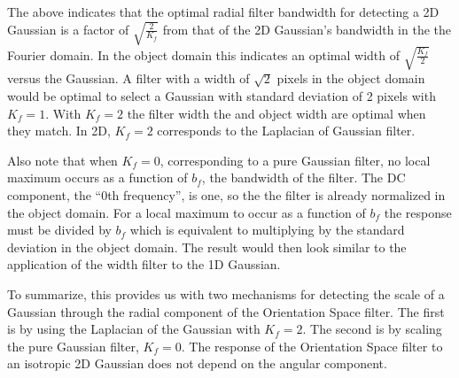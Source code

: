 \documentclass{article}
\begin{document}
The above indicates that the optimal radial filter bandwidth for detecting a 2D Gaussian is a factor of $ \sqrt{\frac{2}{K_f}} $ from that of the 2D Gaussian's bandwidth in the the Fourier domain. In the object domain this indicates an optimal width of $ \sqrt{\frac{K_f}{2}} $ versus the Gaussian. A filter with a width of $ \sqrt{2} $ pixels in the object domain would be optimal to select a Gaussian with standard deviation of 2 pixels with $ K_f = 1 $. With $ K_f = 2 $ the filter width the and object width are optimal when they match. In 2D, $ K_f = 2 $ corresponds to the Laplacian of Gaussian filter.

Also note that when $ K_f = 0 $, corresponding to a pure Gaussian filter, no local maximum occurs as a function of $ b_f $, the bandwidth of the filter. The DC component, the ``0th frequency'', is one, so the the filter is already normalized in the object domain. For a local maximum to occur as a function of $ b_f $ the response must be divided by $ b_f $ which is equivalent to multiplying by the standard deviation in the object domain. The result would then look similar to the application of the width filter to the 1D Gaussian.

To summarize, this provides us with two mechanisms for detecting the scale of a Gaussian through the radial component of the Orientation Space filter. The first is by using the Laplacian of the Gaussian with $ K_f = 2 $. The second is by scaling the pure Gaussian filter, $ K_f = 0 $. The response of the Orientation Space filter to an isotropic 2D Gaussian does not depend on the angular component.
\end{document}
